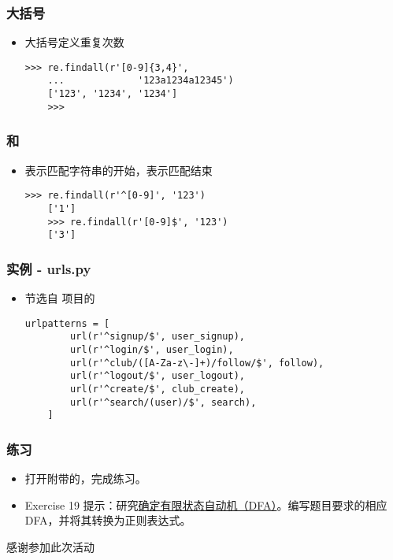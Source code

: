 \begin{CJK}{UTF8}{gbsn}
\begin{frame} [fragile]
	\frametitle{大括号}
	\linespread{1.5}
	\begin{itemize}
	\item 大括号定义重复次数
	\begin{lstlisting}[style=pythonstyle, gobble=4, texcl]
	>>> re.findall(r'[0-9]{3,4}', 
	... 			'123a1234a12345')
	['123', '1234', '1234']
	>>> 
	\end{lstlisting}
	\end{itemize}
\end{frame}

\begin{frame} [fragile]
	\frametitle{\inlineBash{^} 和 \inlineBash{$}}
	\linespread{1.5}
	\begin{itemize}
	\item \inlineBash{^}表示匹配字符串的开始，\inlineBash{$}表示匹配结束
	\begin{lstlisting}[style=pythonstyle, gobble=4, texcl]
	>>> re.findall(r'^[0-9]', '123')
	['1']
	>>> re.findall(r'[0-9]$', '123')
	['3']
	\end{lstlisting}
	\end{itemize}
\end{frame}

\begin{frame} [fragile]
	\frametitle{实例 - urls.py}
	\linespread{1.5}
	\begin{itemize}
	\item 节选自 \href{https://github.com/lxylxy123456/shierquan/}
			{} 项目的
			\href{https://github.com/lxylxy123456/shierquan/blob/master/quan\_account/urls.py}
			{}
	\begin{lstlisting}[style=pythonstyle, gobble=4, texcl]
	urlpatterns = [
		url(r'^signup/$', user_signup),
		url(r'^login/$', user_login),
		url(r'^club/([A-Za-z\-]+)/follow/$', follow),
		url(r'^logout/$', user_logout),
		url(r'^create/$', club_create),
		url(r'^search/(user)/$', search),
	]
	\end{lstlisting}
	\end{itemize}
\end{frame}

\begin{frame} [fragile]
	\frametitle{练习}
	\linespread{1.5}
	\begin{itemize}
	\item 打开附带的\href{https://github.com/lxylxy123456/HCCTalks/blob/master/RegExpTalk01.html}
						{}，完成练习。
	\item Exercise 19 提示：研究\href{https://zh.wikipedia.org/wiki/\%E7\%A1\%AE\%E5\%AE\%9A\%E6\%9C\%89\%E9\%99\%90\%E7\%8A\%B6\%E6\%80\%81\%E8\%87\%AA\%E5\%8A\%A8\%E6\%9C\%BA}
	{确定有限状态自动机（DFA）}。编写题目要求的相应DFA，并将其转换为正则表达式。
	\end{itemize}
\end{frame}

\PreLastFrame
\begin{frame}
	\centerline{\fontsize{32}{32}\selectfont 感谢参加此次活动}
\end{frame}

\newpage
\end{CJK}



